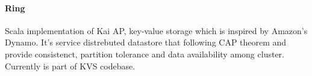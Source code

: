 \paragraph{Ring}
Scala implementation of Kai AP, key-value storage which is inspired by Amazon's Dynamo. It's service distrebuted datastore that
following CAP theorem and provide consistenct, partition tolerance and data availability among cluster. Currently is part of KVS codebase.

